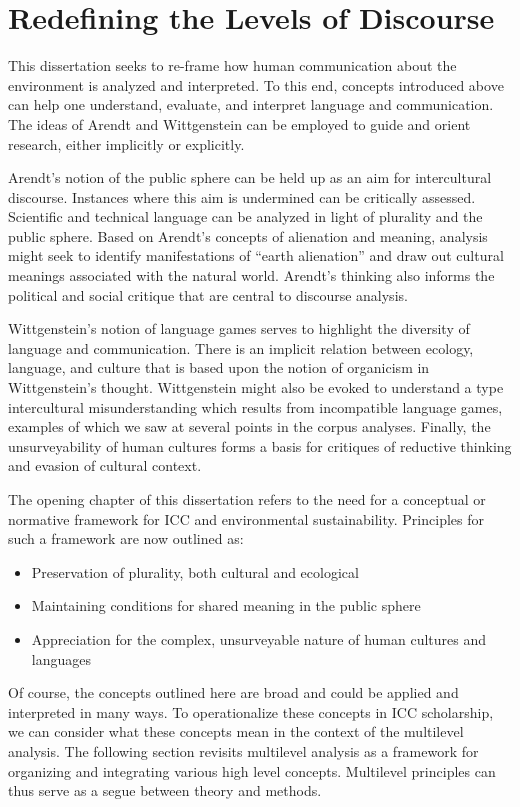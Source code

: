 \section{Redefining the Levels of Discourse}

This dissertation seeks to re-frame how human communication about the environment is analyzed and interpreted. To this end, concepts introduced above can help one understand, evaluate, and interpret language and communication. The ideas of Arendt and Wittgenstein can be employed to guide and orient research, either implicitly or explicitly.

Arendt's notion of the public sphere can be held up as an aim for intercultural discourse. Instances where this aim is undermined can be critically assessed. Scientific and technical language can be analyzed in light of plurality and the public sphere. Based on Arendt's concepts of alienation and meaning, analysis might seek to identify manifestations of ``earth alienation'' and draw out cultural meanings associated with the natural world. Arendt's thinking also informs the political and social critique that are central to discourse analysis.

Wittgenstein's notion of language games serves to highlight the diversity of language and communication. There is an implicit relation between ecology, language, and culture that is based upon the notion of organicism in Wittgenstein's thought. Wittgenstein might also be evoked to understand a type intercultural misunderstanding which results from incompatible language games, examples of which we saw at several points in the corpus analyses. Finally, the unsurveyability of human cultures forms a basis for critiques of reductive thinking and evasion of cultural context.

The opening chapter of this dissertation refers to the need for a conceptual or normative framework for ICC and environmental sustainability. Principles for such a framework are now outlined as:

\begin{itemize}
  \item Preservation of plurality, both cultural and ecological
  \item Maintaining conditions for shared meaning in the public sphere
  \item Appreciation for the complex, unsurveyable nature of human cultures and languages
\end{itemize}

Of course, the concepts outlined here are broad and could be applied and interpreted in many ways. To operationalize these concepts in ICC scholarship, we can consider what these concepts mean in the context of the multilevel analysis. The following section revisits multilevel analysis as a framework for organizing and integrating various high level concepts. Multilevel principles can thus serve as a segue between theory and methods.  

